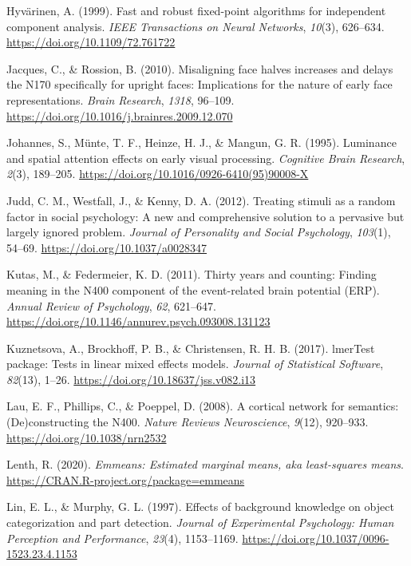 \documentclass[
  english,
  man,floatsintext]{apa7}
\begin{document}
\leavevmode\hypertarget{ref-hyvuxe4rinen1999}{}%
Hyvärinen, A. (1999). Fast and robust fixed-point algorithms for independent component analysis. \emph{IEEE Transactions on Neural Networks}, \emph{10}(3), 626--634. \url{https://doi.org/10.1109/72.761722}

\leavevmode\hypertarget{ref-jacques2010}{}%
Jacques, C., \& Rossion, B. (2010). Misaligning face halves increases and delays the N170 specifically for upright faces: Implications for the nature of early face representations. \emph{Brain Research}, \emph{1318}, 96--109. \url{https://doi.org/10.1016/j.brainres.2009.12.070}

\leavevmode\hypertarget{ref-johannes1995}{}%
Johannes, S., Münte, T. F., Heinze, H. J., \& Mangun, G. R. (1995). Luminance and spatial attention effects on early visual processing. \emph{Cognitive Brain Research}, \emph{2}(3), 189--205. \url{https://doi.org/10.1016/0926-6410(95)90008-X}

\leavevmode\hypertarget{ref-judd2012}{}%
Judd, C. M., Westfall, J., \& Kenny, D. A. (2012). Treating stimuli as a random factor in social psychology: A new and comprehensive solution to a pervasive but largely ignored problem. \emph{Journal of Personality and Social Psychology}, \emph{103}(1), 54--69. \url{https://doi.org/10.1037/a0028347}

\leavevmode\hypertarget{ref-kutas2011}{}%
Kutas, M., \& Federmeier, K. D. (2011). Thirty years and counting: Finding meaning in the N400 component of the event-related brain potential (ERP). \emph{Annual Review of Psychology}, \emph{62}, 621--647. \url{https://doi.org/10.1146/annurev.psych.093008.131123}

\leavevmode\hypertarget{ref-R-lmerTest}{}%
Kuznetsova, A., Brockhoff, P. B., \& Christensen, R. H. B. (2017). lmerTest package: Tests in linear mixed effects models. \emph{Journal of Statistical Software}, \emph{82}(13), 1--26. \url{https://doi.org/10.18637/jss.v082.i13}

\leavevmode\hypertarget{ref-lau2008}{}%
Lau, E. F., Phillips, C., \& Poeppel, D. (2008). A cortical network for semantics: (De)constructing the N400. \emph{Nature Reviews Neuroscience}, \emph{9}(12), 920--933. \url{https://doi.org/10.1038/nrn2532}

\leavevmode\hypertarget{ref-R-emmeans}{}%
Lenth, R. (2020). \emph{Emmeans: Estimated marginal means, aka least-squares means}. \url{https://CRAN.R-project.org/package=emmeans}

\leavevmode\hypertarget{ref-lin1997}{}%
Lin, E. L., \& Murphy, G. L. (1997). Effects of background knowledge on object categorization and part detection. \emph{Journal of Experimental Psychology: Human Perception and Performance}, \emph{23}(4), 1153--1169. \url{https://doi.org/10.1037/0096-1523.23.4.1153}
\end{document}
